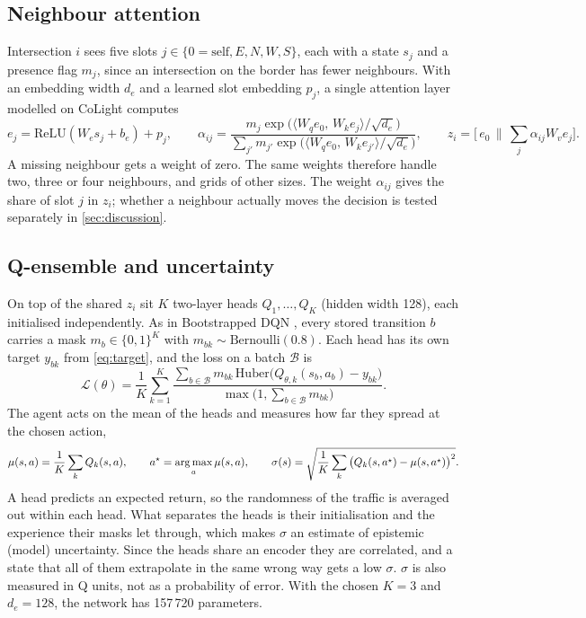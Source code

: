 \subsection{Neighbour attention}
Intersection $i$ sees five slots $j\in\{0{=}\text{self},E,N,W,S\}$, each with a state $s_j$
and a presence flag $m_j$, since an intersection on the border has fewer neighbours. With an
embedding width $d_e$ and a learned slot embedding $p_j$, a single attention layer modelled on
CoLight \citep{wei2019colight} computes
\begin{equation}
e_j=\mathrm{ReLU}(W_e s_j+b_e)+p_j,\qquad
\alpha_{ij}=\frac{m_j\exp\!\big(\langle W_q e_0,\,W_k e_j\rangle/\sqrt{d_e}\big)}
{\sum_{j'}m_{j'}\exp\!\big(\langle W_q e_0,\,W_k e_{j'}\rangle/\sqrt{d_e}\big)},\qquad
z_i=\Big[\,e_0\,\Big\|\,\sum_j\alpha_{ij}W_v e_j\Big].
\label{eq:attention}
\end{equation}
A missing neighbour gets a weight of zero. The same weights therefore handle two, three or
four neighbours, and grids of other sizes. The weight $\alpha_{ij}$ gives the share of slot
$j$ in $z_i$; whether a neighbour actually moves the decision is tested separately in
\cref{sec:discussion}.

\subsection{Q-ensemble and uncertainty}
On top of the shared $z_i$ sit $K$ two-layer heads $Q_1,\dots,Q_K$ (hidden width 128),
each initialised independently. As in Bootstrapped DQN \citep{osband2016deep}, every stored
transition $b$ carries a mask $m_b\in\{0,1\}^K$ with $m_{bk}\sim\mathrm{Bernoulli}(0.8)$. Each
head has its own target $y_{bk}$ from \cref{eq:target}, and the loss on a batch $\mathcal B$ is
\begin{equation}
\mathcal L(\theta)=\frac1K\sum_{k=1}^{K}
\frac{\sum_{b\in\mathcal B}m_{bk}\,\mathrm{Huber}\big(Q_{\theta,k}(s_b,a_b)-y_{bk}\big)}
{\max\big(1,\sum_{b\in\mathcal B}m_{bk}\big)} .
\label{eq:loss}
\end{equation}
The agent acts on the mean of the heads and measures how far they spread at the chosen action,
\begin{equation}
\mu(s,a)=\frac1K\sum_{k}Q_k(s,a),\qquad a^\star=\operatorname*{arg\,max}_a\mu(s,a),\qquad
\sigma(s)=\sqrt{\frac1K\sum_k\big(Q_k(s,a^\star)-\mu(s,a^\star)\big)^2}.
\label{eq:sigma}
\end{equation}
A head predicts an expected return, so the randomness of the traffic is averaged out within
each head. What separates the heads is their initialisation and the experience their masks let
through, which makes $\sigma$ an estimate of epistemic (model) uncertainty. Since the heads
share an encoder they are correlated, and a state that all of them extrapolate in the same
wrong way gets a low $\sigma$. $\sigma$ is also measured in Q units, not as a probability of
error. With the chosen $K=3$ and $d_e=128$, the network has 157\,720 parameters.

